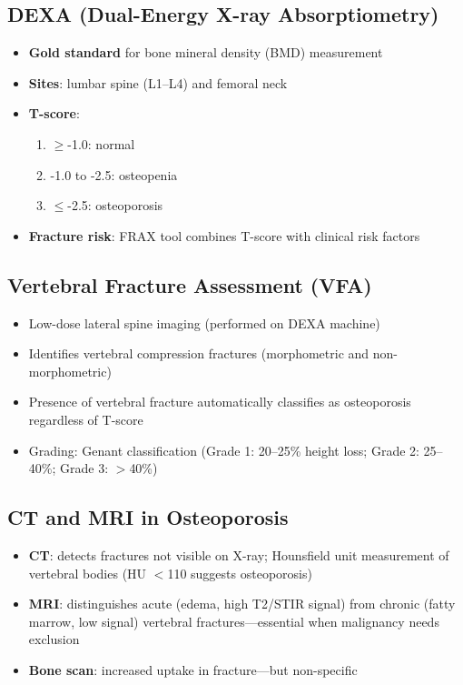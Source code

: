 \subsection{DEXA (Dual-Energy X-ray Absorptiometry)}
\begin{itemize}
  \item \textbf{Gold standard} for bone mineral density (BMD) measurement
  \item \textbf{Sites}: lumbar spine (L1--L4) and femoral neck
  \item \textbf{T-score}:
    \begin{enumerate}
      \item $\geq$-1.0: normal
      \item -1.0 to -2.5: osteopenia
      \item $\leq$-2.5: osteoporosis
    \end{enumerate}
  \item \textbf{Fracture risk}: FRAX tool combines T-score with clinical risk factors
\end{itemize}

\subsection{Vertebral Fracture Assessment (VFA)}
\begin{itemize}
  \item Low-dose lateral spine imaging (performed on DEXA machine)
  \item Identifies vertebral compression fractures (morphometric and non-morphometric)
  \item Presence of vertebral fracture automatically classifies as osteoporosis regardless of T-score
  \item Grading: Genant classification (Grade 1: 20--25\% height loss; Grade 2: 25--40\%; Grade 3: $>$40\%)
\end{itemize}

\subsection{CT and MRI in Osteoporosis}
\begin{itemize}
  \item \textbf{CT}: detects fractures not visible on X-ray; Hounsfield unit measurement of vertebral bodies (HU $<$110 suggests osteoporosis)
  \item \textbf{MRI}: distinguishes acute (edema, high T2/STIR signal) from chronic (fatty marrow, low signal) vertebral fractures---essential when malignancy needs exclusion
  \item \textbf{Bone scan}: increased uptake in fracture---but non-specific
\end{itemize}

